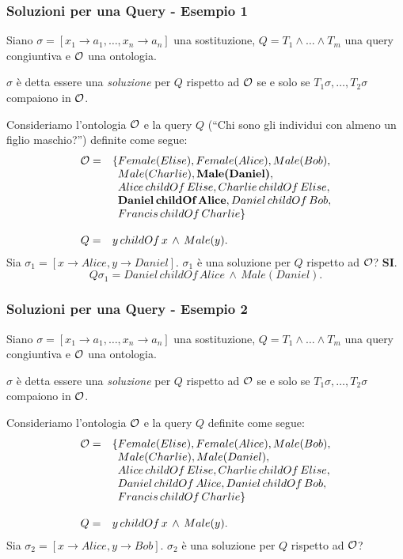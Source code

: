 \documentclass[8pt]{beamer}
\begin{document}
\begin{frame}
\frametitle{Soluzioni per una Query - Esempio 1}
Siano $\sigma=[x_1 \rightarrow a_1, \ldots, x_n \rightarrow a_n]$ una sostituzione,
$Q=T_1 \wedge \ldots \wedge T_m$ una query congiuntiva e $\mathcal{O}$ una ontologia.
\vspace{\baselineskip}

$\sigma$ \`e detta essere una \emph{soluzione} per $Q$ rispetto ad $\mathcal{O}$ se
e solo se $T_1\sigma, \ldots, T_2\sigma$ compaiono in $\mathcal{O}$. 
\vspace{\baselineskip}

Consideriamo l'ontologia $\mathcal{O}$ e la query $Q$ (``Chi sono gli individui con almeno un figlio maschio?'') definite come segue:
\[
\begin{array}{cl}
  \Ont  =  &  \{Female(Elise), Female(Alice), Male(Bob), \\
  &\phantom{\{}Male(Charlie), \textbf{Male(Daniel)}, \\
  &\phantom{\{}Alice\,childOf\,Elise, Charlie\,childOf\,Elise, \\
  &\phantom{\{}\textbf{Daniel\,childOf\,Alice}, Daniel\,childOf\,Bob, \\
  &\phantom{\{}Francis\,childOf\,Charlie \}\\
  &\\
  Q = & y\,childOf\,x\,\wedge\,Male(y) .
 \end{array}
\]
Sia $\sigma_1=[x \rightarrow Alice, y \rightarrow Daniel]$. $\sigma_1$ \`e una soluzione per $Q$
rispetto ad $\mathcal{O}$? \textbf{SI}.
\[
 Q\sigma_1 = Daniel\,childOf\,Alice\,\wedge\,Male(Daniel) .
\]
\end{frame}

\begin{frame}
\frametitle{Soluzioni per una Query - Esempio 2}
Siano $\sigma=[x_1 \rightarrow a_1, \ldots, x_n \rightarrow a_n]$ una sostituzione,
$Q=T_1 \wedge \ldots \wedge T_m$ una query congiuntiva e $\mathcal{O}$ una ontologia.
\vspace{\baselineskip}

$\sigma$ \`e detta essere una \emph{soluzione} per $Q$ rispetto ad $\mathcal{O}$ se
e solo se $T_1\sigma, \ldots, T_2\sigma$ compaiono in $\mathcal{O}$. 
\vspace{\baselineskip}

Consideriamo l'ontologia $\mathcal{O}$ e la query $Q$ definite come segue:
\[
\begin{array}{cl}
  \Ont  =  &  \{Female(Elise), Female(Alice), Male(Bob), \\
  &\phantom{\{}Male(Charlie), Male(Daniel), \\
  &\phantom{\{}Alice\,childOf\,Elise, Charlie\,childOf\,Elise, \\
  &\phantom{\{}Daniel\,childOf\,Alice, Daniel\,childOf\,Bob, \\
  &\phantom{\{}Francis\,childOf\,Charlie \}\\
  &\\
  Q = & y\,childOf\,x\,\wedge\,Male(y) .
 \end{array}
\]
Sia $\sigma_2=[x \rightarrow Alice, y \rightarrow Bob]$. $\sigma_2$ \`e una soluzione per $Q$
rispetto ad $\mathcal{O}$?
\end{frame}
\end{document}
